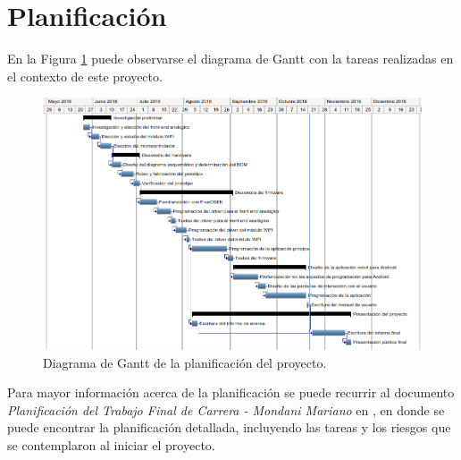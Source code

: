 \section{Planificación}

En la Figura \ref{fig:diagrama_gantt} puede observarse el diagrama de Gantt con la tareas realizadas en el contexto de este proyecto.

\begin{figure}[!h]
	\centering
	\includegraphics[width=18cm, angle=90]{./Figures/2_3_diagrama-Gantt.png}
	\caption{Diagrama de Gantt de la planificación del proyecto.}
	\label{fig:diagrama_gantt}
\end{figure}


Para mayor información acerca de la planificación se puede recurrir al documento \textit{Planificación del Trabajo Final de Carrera - Mondani Mariano} en \citep{repo_planificacion}, en donde se puede encontrar la planificación detallada, incluyendo las tareas y los riesgos que se contemplaron al iniciar el proyecto.
